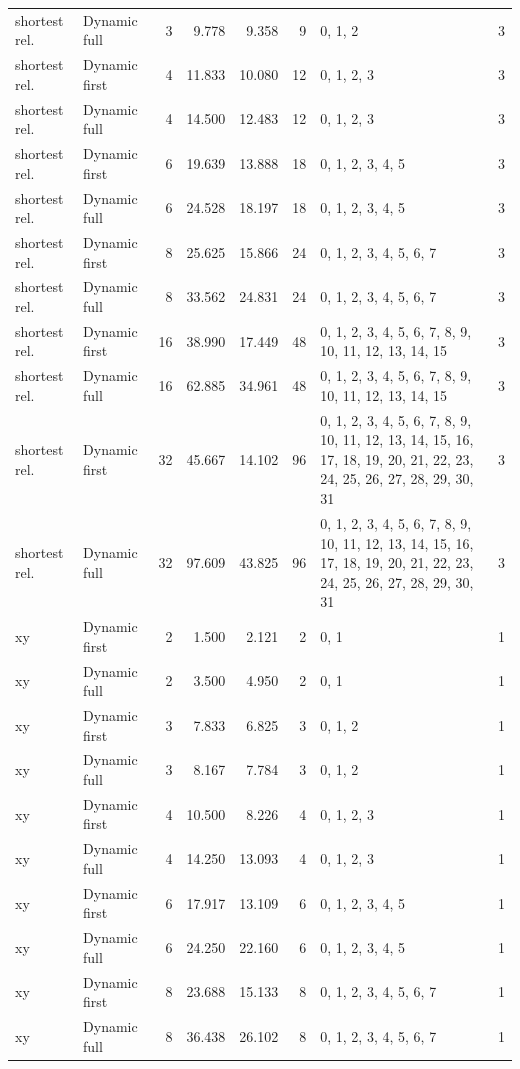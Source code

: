 \documentclass[10pt,a4paper]{article}
\begin{document}
\begin{longtable}{@{}p{23mm}p{29mm}rrrrp{36mm}r@{}}
shortest rel. & Dynamic full & 3 & 9.778 & 9.358 & 9 & 0, 1, 2 & 3 \\
shortest rel. & Dynamic first & 4 & 11.833 & 10.080 & 12 & 0, 1, 2, 3 & 3 \\
shortest rel. & Dynamic full & 4 & 14.500 & 12.483 & 12 & 0, 1, 2, 3 & 3 \\
shortest rel. & Dynamic first & 6 & 19.639 & 13.888 & 18 & 0, 1, 2, 3, 4, 5 & 3 \\
shortest rel. & Dynamic full & 6 & 24.528 & 18.197 & 18 & 0, 1, 2, 3, 4, 5 & 3 \\
shortest rel. & Dynamic first & 8 & 25.625 & 15.866 & 24 & 0, 1, 2, 3, 4, 5, 6, 7 & 3 \\
shortest rel. & Dynamic full & 8 & 33.562 & 24.831 & 24 & 0, 1, 2, 3, 4, 5, 6, 7 & 3 \\
shortest rel. & Dynamic first & 16 & 38.990 & 17.449 & 48 & 0, 1, 2, 3, 4, 5, 6, 7, 8, 9, 10, 11, 12, 13, 14, 15 & 3 \\
shortest rel. & Dynamic full & 16 & 62.885 & 34.961 & 48 & 0, 1, 2, 3, 4, 5, 6, 7, 8, 9, 10, 11, 12, 13, 14, 15 & 3 \\
shortest rel. & Dynamic first & 32 & 45.667 & 14.102 & 96 & 0, 1, 2, 3, 4, 5, 6, 7, 8, 9, 10, 11, 12, 13, 14, 15, 16, 17, 18, 19, 20, 21, 22, 23, 24, 25, 26, 27, 28, 29, 30, 31 & 3 \\
shortest rel. & Dynamic full & 32 & 97.609 & 43.825 & 96 & 0, 1, 2, 3, 4, 5, 6, 7, 8, 9, 10, 11, 12, 13, 14, 15, 16, 17, 18, 19, 20, 21, 22, 23, 24, 25, 26, 27, 28, 29, 30, 31 & 3 \\
xy & Dynamic first & 2 & 1.500 & 2.121 & 2 & 0, 1 & 1 \\
xy & Dynamic full & 2 & 3.500 & 4.950 & 2 & 0, 1 & 1 \\
xy & Dynamic first & 3 & 7.833 & 6.825 & 3 & 0, 1, 2 & 1 \\
xy & Dynamic full & 3 & 8.167 & 7.784 & 3 & 0, 1, 2 & 1 \\
xy & Dynamic first & 4 & 10.500 & 8.226 & 4 & 0, 1, 2, 3 & 1 \\
xy & Dynamic full & 4 & 14.250 & 13.093 & 4 & 0, 1, 2, 3 & 1 \\
xy & Dynamic first & 6 & 17.917 & 13.109 & 6 & 0, 1, 2, 3, 4, 5 & 1 \\
xy & Dynamic full & 6 & 24.250 & 22.160 & 6 & 0, 1, 2, 3, 4, 5 & 1 \\
xy & Dynamic first & 8 & 23.688 & 15.133 & 8 & 0, 1, 2, 3, 4, 5, 6, 7 & 1 \\
xy & Dynamic full & 8 & 36.438 & 26.102 & 8 & 0, 1, 2, 3, 4, 5, 6, 7 & 1 \\

\end{longtable}
\end{document}
